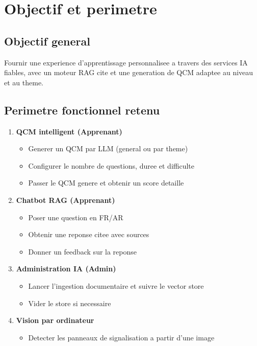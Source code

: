 \documentclass[a4paper,12pt]{report}
\begin{document}
\section{Objectif et perimetre}

\subsection{Objectif general}

Fournir une experience d'apprentissage personnalisee a travers des services IA
fiables, avec un moteur RAG cite et une generation de QCM adaptee au niveau
et au theme.

\subsection{Perimetre fonctionnel retenu}

\begin{enumerate}
  \item \textbf{QCM intelligent (Apprenant)}
  \begin{itemize}
    \item Generer un QCM par LLM (general ou par theme)
    \item Configurer le nombre de questions, duree et difficulte
    \item Passer le QCM genere et obtenir un score detaille
  \end{itemize}
  \item \textbf{Chatbot RAG (Apprenant)}
  \begin{itemize}
    \item Poser une question en FR/AR
    \item Obtenir une reponse citee avec sources
    \item Donner un feedback sur la reponse
  \end{itemize}
  \item \textbf{Administration IA (Admin)}
  \begin{itemize}
    \item Lancer l'ingestion documentaire et suivre le vector store
    \item Vider le store si necessaire
  \end{itemize}
  \item \textbf{Vision par ordinateur}
  \begin{itemize}
    \item Detecter les panneaux de signalisation a partir d'une image
  \end{itemize}
\end{enumerate}
\end{document}
